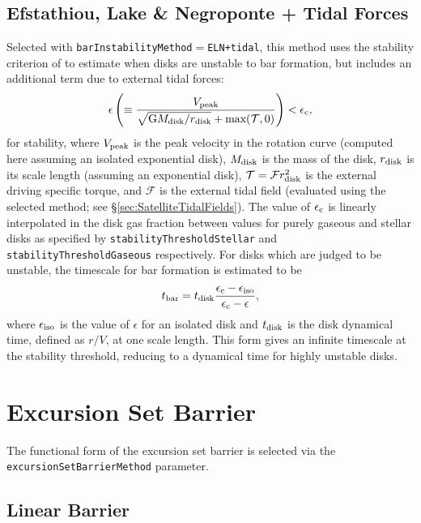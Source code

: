 \subsection{Efstathiou, Lake \& Negroponte + Tidal Forces}

Selected with {\tt barInstabilityMethod}$=${\tt ELN+tidal}, this method uses the stability criterion of \cite{efstathiou_stability_1982} to estimate when disks are unstable to bar formation, but includes an additional term due to external tidal forces:
\begin{equation}
 \epsilon \left( \equiv {V_{\rm peak} \over \sqrt{\G M_{\rm disk}/r_{\rm disk}} + \hbox{max}(\mathcal{T},0) } \right) < \epsilon_{\rm c},
\end{equation}
for stability, where $V_{\rm peak}$ is the peak velocity in the rotation curve (computed here assuming an isolated exponential disk), $M_{\rm disk}$ is the mass of the disk, $r_{\rm disk}$ is its scale length (assuming an exponential disk), $\mathcal{T} = \mathcal{F} r_{\rm disk}^2$ is the external driving specific torque, and $\mathcal{F}$ is the external tidal field (evaluated using the selected method; see \S\ref{sec:SatelliteTidalFields}). The value of $\epsilon_{\rm c}$ is linearly interpolated in the disk gas fraction between values for purely gaseous and stellar disks as specified by {\tt stabilityThresholdStellar} and {\tt stabilityThresholdGaseous} respectively. For disks which are judged to be unstable, the timescale for bar formation is estimated to be
\begin{equation}
 t_{\rm bar} = t_{\rm disk} {\epsilon_{\rm c} - \epsilon_{\rm iso} \over \epsilon_{\rm c} - \epsilon},
\end{equation}
where $\epsilon_{\rm iso}$ is the value of $\epsilon$ for an isolated disk and $t_{\rm disk}$ is the disk dynamical time, defined as $r/V$, at one scale length. This form gives an infinite timescale at the stability threshold, reducing to a dynamical time for highly unstable disks.

\section{Excursion Set Barrier}

The functional form of the excursion set barrier is selected via the {\tt excursionSetBarrierMethod} parameter.

\subsection{Linear Barrier}

